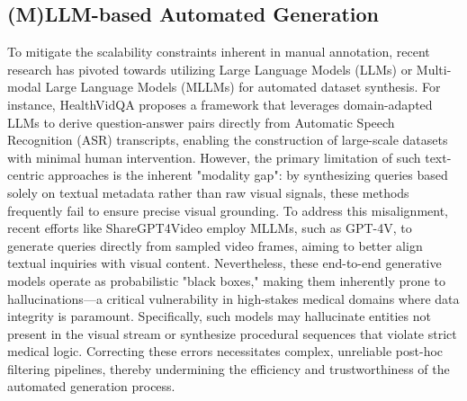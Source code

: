 \subsection{(M)LLM-based Automated Generation}
To mitigate the scalability constraints inherent in manual annotation, recent research has pivoted towards utilizing Large Language Models (LLMs) or Multi-modal Large Language Models (MLLMs) for automated dataset synthesis.
For instance, HealthVidQA \cite{HealthVid} proposes a framework that leverages domain-adapted LLMs to derive question-answer pairs directly from Automatic Speech Recognition (ASR) transcripts, enabling the construction of large-scale datasets with minimal human intervention.
However, the primary limitation of such text-centric approaches is the inherent "modality gap": by synthesizing queries based solely on textual metadata rather than raw visual signals, these methods frequently fail to ensure precise visual grounding.
To address this misalignment, recent efforts like ShareGPT4Video \cite{ShareGPT4Video} employ MLLMs, such as GPT-4V, to generate queries directly from sampled video frames, aiming to better align textual inquiries with visual content.
Nevertheless, these end-to-end generative models operate as probabilistic "black boxes," making them inherently prone to hallucinations—a critical vulnerability in high-stakes medical domains where data integrity is paramount.
Specifically, such models may hallucinate entities not present in the visual stream or synthesize procedural sequences that violate strict medical logic. Correcting these errors necessitates complex, unreliable post-hoc filtering pipelines, thereby undermining the efficiency and trustworthiness of the automated generation process.

